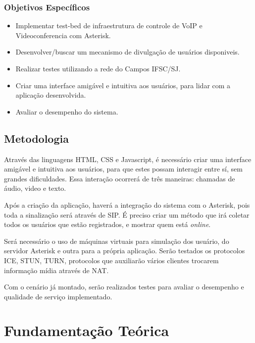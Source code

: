 \documentclass[12pt,a4paper,oneside]{report}
\begin{document}
\subsection{Objetivos Específicos}
\label{ss_objEspecicos}

\begin{itemize} %
 \item Implementar test-bed de infraestrutura de controle de VoIP e Videoconferencia com Asterisk.
 \item Desenvolver/buscar um mecanismo de divulgação de usuários disponiveis.
 \item Realizar testes utilizando a rede do Campos IFSC/SJ.
 \item Criar uma interface amigável e intuitiva aos usuários, para lidar com a aplicação desenvolvida.
 \item Avaliar o desempenho do sistema.
\end{itemize}


\section{Metodologia}
\label{s_metodologia} %

Através das linguagens HTML, CSS e Javascript, é necessário criar uma interface amigável e intuitiva aos usuários, para que estes possam interagir entre sí, sem grandes dificuldades. Essa interação ocorrerá de três maneiras: chamadas de áudio, video e texto.

Após a criação da aplicação, haverá a integração do sistema com o Asterisk, pois toda a sinalização será através de SIP. É preciso criar um método que irá coletar todos os usuários que estão registrados, e mostrar quem está \textit{online}.

Será necessário o uso de máquinas virtuais para simulação dos usuário, do servidor Asterisk e outra para a própria aplicação. Serão testados os protocolos ICE, STUN, TURN, protocolos que auxiliarão vários clientes trocarem informação mídia através de NAT.

Com o cenário já montado, serão realizados testes para avaliar o desempenho e qualidade de serviço implementado.


\chapter{Fundamentação Teórica} %
\label{c_fundamentacaoTeorica} %
\end{document}
